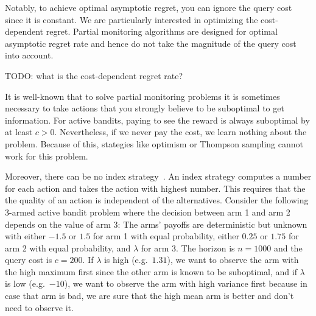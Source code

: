 \documentclass[a4paper]{article}
\begin{document}
Notably, to achieve optimal asymptotic regret, you can ignore the query cost since it is constant.
We are particularly interested in optimizing
the cost-dependent regret.
Partial monitoring algorithms are designed for optimal asymptotic regret rate and hence do not take the magnitude of the query cost into account.

TODO: what is the cost-dependent regret rate?

It is well-known that to solve partial monitoring problems
it is sometimes necessary to take actions that you strongly believe to be suboptimal to get information.
For active bandits, paying to see the reward is always suboptimal
by at least $c > 0$.
Nevertheless, if we never pay the cost, we learn nothing about the problem.
Because of this, stategies like optimism or Thompson sampling cannot work for this problem.

Moreover, there can be no index strategy~\citep[Ex.~4]{Hay12}.
An index strategy computes a number for each action
and takes the action with highest number.
This requires that
the the quality of an action is independent of the alternatives.
Consider the following 3-armed active bandit problem
where the decision between arm 1 and arm 2 depends
on the value of arm 3:
The arms' payoffs are deterministic but unknown with
either $-1.5$ or $1.5$ for arm 1 with equal probability,
either $0.25$ or $1.75$ for arm 2 with equal probability, and
$\lambda$ for arm 3.
The horizon is $n = 1000$
and the query cost is $c = 200$.
If $\lambda$ is high (e.g.\ $1.31$),
we want to observe the arm with the high maximum first
since the other arm is known to be suboptimal, and
if $\lambda$ is low (e.g.\ $-10$),
we want to observe the arm with high variance first
because in case that arm is bad, we are sure that
the high mean arm is better and don't need to observe it.
\end{document}
